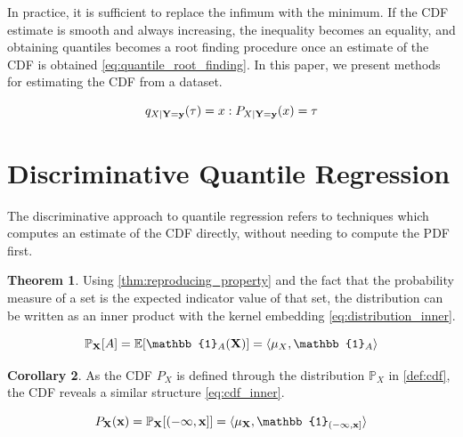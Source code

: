 \documentclass[twoside]{article} \usepackage{aistats2017}
\theoremstyle{definition}
\newtheorem{theorem}{Theorem}[section]
\newtheorem{corollary}[theorem]{Corollary}
\newcommand{\rv}[1]{{#1}}
\begin{document}
		In practice, it is sufficient to replace the infimum with the minimum. If the CDF estimate is smooth and always increasing, the inequality becomes an equality, and obtaining quantiles becomes a root finding procedure once an estimate of the CDF is obtained \eqref{eq:quantile_root_finding}. In this paper, we present methods for estimating the CDF from a dataset.
		
		\begin{equation}
			q_{\rv{X} | \bvec{\rv{Y}} = \bvec{y}}(\tau) = x : P_{\rv{X} | \bvec{\rv{Y}} = \bvec{y}}(x) = \tau
		\label{eq:quantile_root_finding}
		\end{equation}	
	
\section{Discriminative Quantile Regression}
\label{sec:discriminative_quantile_regression}

	The discriminative approach to quantile regression refers to techniques which computes an estimate of the CDF directly, without needing to compute the PDF first.
	
	\begin{theorem} \label{thm:distribution_inner}
		Using \cref{thm:reproducing_property} and the fact that the probability measure of a set is the expected indicator value of that set, the distribution can be written as an inner product with the kernel embedding \eqref{eq:distribution_inner}.
		
		\begin{equation}
			\mathbb{P}_{\bvec{\rv{X}}}[A] = \mathbb{E}[\mathbb{1}_{A}(\bvec{\rv{X}})] = \langle \mu_{\rv{X}}, \mathbb{1}_{A} \rangle
		\label{eq:distribution_inner}
		\end{equation}
	\end{theorem}
	
	\begin{corollary} \label{thm:cdf_inner}
		As the CDF $P_{\rv{X}}$ is defined through the distribution $\mathbb{P}_{\rv{X}}$ in \cref{def:cdf}, the CDF reveals a similar structure \eqref{eq:cdf_inner}.
			
		\begin{equation}
			P_{\bvec{\rv{X}}}(\bvec{x}) = \mathbb{P}_{\bvec{\rv{X}}}[(-\bvec{\infty}, \bvec{x}]] = \langle \mu_{\bvec{\rv{X}}}, \mathbb{1}_{(-\bvec{\infty}, \bvec{x}]} \rangle
		\label{eq:cdf_inner}
		\end{equation}
	\end{corollary}
\end{document}
